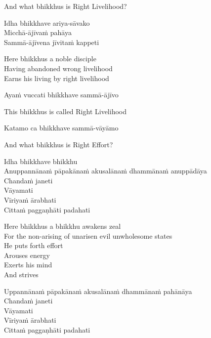 \begin{english}
  And what bhikkhus is Right Livelihood?\makeatletter\hyperlink{endnote157-appendix}\makeatother
\end{english}

Idha bhikkhave ariya-sāvako\\
Micchā-ājīvaṁ pahāya\\
Sammā-ājīvena jīvitaṁ kappeti

\begin{english-verses}
  Here bhikkhus a noble disciple\\
  Having abandoned wrong livelihood\\
  Earns his living by right livelihood
\end{english-verses}

Ayaṁ vuccati bhikkhave sammā-ājīvo

\begin{english}
  This bhikkhus is called Right Livelihood
\end{english}

Katamo ca bhikkhave sammā-vāyāmo

\begin{english}
  And what bhikkhus is Right Effort?
\end{english}

Idha bhikkhave bhikkhu\\
Anuppannānaṁ pāpakānaṁ akusalānaṁ dhammānaṁ anuppādāya\\
Chandaṁ janeti\\
Vāyamati\\
Vīriyaṁ ārabhati\\
Cittaṁ paggaṇhāti padahati

\begin{english-verses}
  Here bhikkhus a bhikkhu awakens zeal\\
  For the non-arising of unarisen evil unwholesome states\\
  He puts forth effort\\
  Arouses energy\\
  Exerts his mind\\
  And strives
\end{english-verses}

Uppannānaṁ pāpakānaṁ akusalānaṁ dhammānaṁ pahānāya\\
Chandaṁ janeti\\
Vāyamati\\
\ifbfiveversion\clearpage\fi
Vīriyaṁ ārabhati\\
Cittaṁ paggaṇhāti padahati

